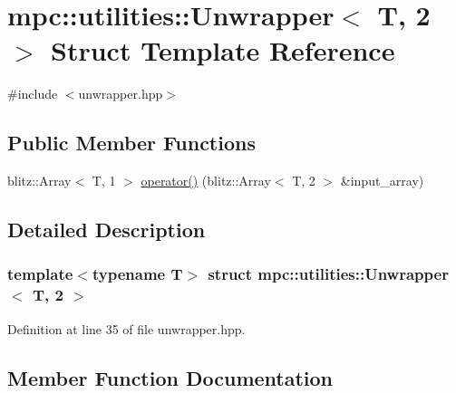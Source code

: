 \hypertarget{structmpc_1_1utilities_1_1_unwrapper_3_01_t_00_012_01_4}{}\section{mpc\+:\+:utilities\+:\+:Unwrapper$<$ T, 2 $>$ Struct Template Reference}
\label{structmpc_1_1utilities_1_1_unwrapper_3_01_t_00_012_01_4}


{\ttfamily \#include $<$unwrapper.\+hpp$>$}

\subsection*{Public Member Functions}
\begin{DoxyCompactItemize}
\item 
blitz\+::\+Array$<$ T, 1 $>$ \mbox{\hyperlink{structmpc_1_1utilities_1_1_unwrapper_3_01_t_00_012_01_4_a3fe1633cd85163f54e330641e0c6a448}{operator()}} (blitz\+::\+Array$<$ T, 2 $>$ \&input\+\_\+array)
\end{DoxyCompactItemize}


\subsection{Detailed Description}
\subsubsection*{template$<$typename T$>$\newline
struct mpc\+::utilities\+::\+Unwrapper$<$ T, 2 $>$}



Definition at line 35 of file unwrapper.\+hpp.



\subsection{Member Function Documentation}
\mbox{\label{structmpc_1_1utilities_1_1_unwrapper_3_01_t_00_012_01_4_a3fe1633cd85163f54e330641e0c6a448}} 
